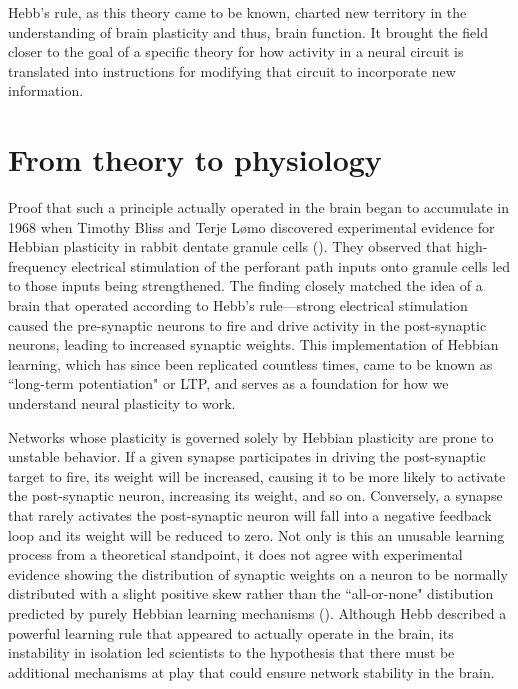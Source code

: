 Hebb's rule, as this theory came to be known, charted new territory in the understanding of brain plasticity and thus, brain function. It brought the field closer to the goal of a specific theory for how activity in a neural circuit is translated into instructions for modifying that circuit to incorporate new information.

\section{From theory to physiology}

Proof that such a principle actually operated in the brain began to accumulate in 1968 when Timothy Bliss and Terje L\o mo discovered experimental evidence for Hebbian plasticity in rabbit dentate granule cells (\cite{Bliss1973}). They observed that high-frequency electrical stimulation of the perforant path inputs onto granule cells led to those inputs being strengthened. The finding closely matched the idea of a brain that operated according to Hebb's rule---strong electrical stimulation caused the pre-synaptic neurons to fire and drive activity in the post-synaptic neurons, leading to increased synaptic weights. This implementation of Hebbian learning, which has since been replicated countless times, came to be known as ``long-term potentiation" or LTP, and serves as a foundation for how we understand neural plasticity to work.

Networks whose plasticity is governed solely by Hebbian plasticity are prone to unstable behavior. If a given synapse participates in driving the post-synaptic target to fire, its weight will be increased, causing it to be more likely to activate the post-synaptic neuron, increasing its weight, and so on. Conversely, a synapse that rarely activates the post-synaptic neuron will fall into a negative feedback loop and its weight will be reduced to zero. Not only is this an unusable learning process from a theoretical standpoint, it does not agree with experimental evidence showing the distribution of synaptic weights on a neuron to be normally distributed with a slight positive skew rather than the ``all-or-none" distibution predicted by purely Hebbian learning mechanisms (\cite{Turrigiano1998}). Although Hebb described a powerful learning rule that appeared to actually operate in the brain, its instability in isolation led scientists to the hypothesis that there must be additional mechanisms at play that could ensure network stability in the brain.

